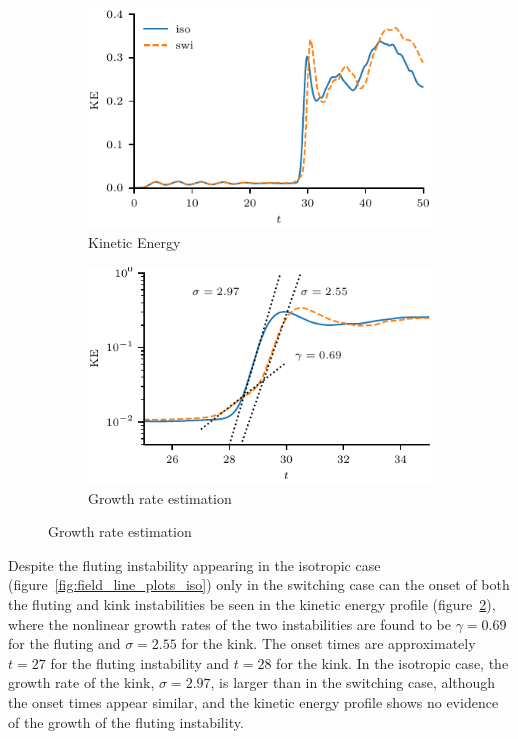 \begin{figure}[t]
  \centering
    \begin{subfigure}{0.49\textwidth}
      \includegraphics[width=\linewidth]{kinetic_energy-4.pdf}
      \caption{Kinetic Energy}
      \label{fig:kink_ke-4}
    \end{subfigure}
    \hfill
    \begin{subfigure}{0.49\textwidth}
      \includegraphics[width=\linewidth]{kinetic_energy_log-4.pdf}
      \caption{Growth rate estimation}
      \label{fig:kink_ke_log-4}
    \end{subfigure}
\label{fig:kink_str8_ke-4}%
\end{figure}

Despite the fluting instability appearing in the isotropic case (figure~\ref{fig:field_line_plots_iso}) only in the switching case can the onset of both the fluting and kink instabilities be seen in the kinetic energy profile (figure~\ref{fig:kink_ke_log-4}), where the nonlinear growth rates of the two instabilities are found to be $\gamma = 0.69$ for the fluting and $\sigma = 2.55$ for the kink. The onset times are approximately $t=27$ for the fluting instability and $t=28$ for the kink. In the isotropic case, the growth rate of the kink, $\sigma = 2.97$, is larger than in the switching case, although the onset times appear similar, and the kinetic energy profile shows no evidence of the growth of the fluting instability.

